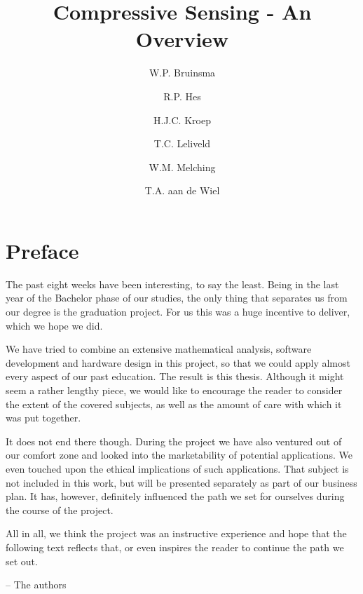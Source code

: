\documentclass[a4paper, openany, oneside]{memoir}
\title{Compressive Sensing - An Overview}
\author{W.P. Bruinsma \and R.P. Hes \and H.J.C. Kroep \and T.C. Leliveld \and W.M. Melching \and T.A. aan de Wiel}
\begin{document}
\chapter{Preface}
The past eight weeks have been interesting, to say the least. Being in the last year of the Bachelor phase of our studies, the only thing that separates us from our degree is the graduation project. For us this was a huge incentive to deliver, which we hope we did. 

We have tried to combine an extensive mathematical analysis, software development and hardware design in this project, so that we could apply almost every aspect of our past education. The result is this thesis. Although it might seem a rather lengthy piece, we would like to encourage the reader to consider the extent of the covered subjects, as well as the amount of care with which it was put together.

It does not end there though. During the project we have also ventured out of our comfort zone and looked into the marketability of potential applications. We even touched upon the ethical implications of such applications. That subject is not included in this work, but will be presented separately as part of our business plan. It has, however, definitely influenced the path we set for ourselves during the course of the project.

All in all, we think the project was an instructive experience and hope that the following text reflects that, or even inspires the reader to continue the path we set out.

\raggedleft -- The authors \qquad\qquad\qquad
\end{document}
